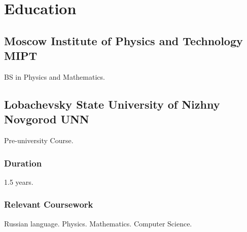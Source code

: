 \section{Educat\textcolor{mycolor}{ion}}
  \subsection{Moscow Institute of Physics and Technology \textcolor{mycolor}{MIPT}}
    \hspace*{\fill}{\textcolor{mygrey}{In progress}}

    BS in Physics and Mathematics.
    \subsection{Lobachevsky State University of Nizhny Novgorod \textcolor{mycolor}{UNN}}
    \hspace*{\fill}{\textcolor{mygrey}{2019}}
    
    Pre-university Course.
    \subsubsection{Duration}
      1.5 years.
    \subsubsection{Relevant Coursework}
      Russian language. Physics. Mathematics. Computer Science.
